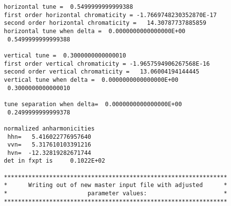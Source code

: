 \begin{footnotesize}
\begin{verbatim}
horizontal tune =  0.5499999999999388
first order horizontal chromaticity = -1.7669748230352870E-17
second order horizontal chromaticity =   14.30787737885859
horizontal tune when delta =  0.0000000000000000E+00
 0.5499999999999388

vertical tune =  0.3000000000000010
first order vertical chromaticity = -1.9657594906267568E-16
second order vertical chromaticity =   13.06004194144445
vertical tune when delta =  0.0000000000000000E+00
 0.3000000000000010

tune separation when delta=  0.0000000000000000E+00
 0.2499999999999378

normalized anharmonicities
 hhn=   5.416022776957640
 vvn=   5.317610103391216
 hvn=  -12.32819282671744
det in fxpt is     0.1022E+02

****************************************************************
*      Writing out of new master input file with adjusted      *
*                       parameter values:                      *
****************************************************************


\end{verbatim}
\end{footnotesize}
